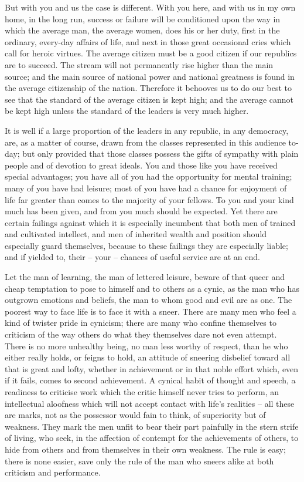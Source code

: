 \documentclass[a4paper]{amsbook}
\begin{document}
But with you and us the case is different. With you here, and with us in my own home, in the long run, success or failure will be conditioned upon the way in which the average man, the average women, does his or her duty, first in the ordinary, every-day affairs of life, and next in those great occasional cries which call for heroic virtues. The average citizen must be a good citizen if our republics are to succeed. The stream will not permanently rise higher than the main source; and the main source of national power and national greatness is found in the average citizenship of the nation. Therefore it behooves us to do our best to see that the standard of the average citizen is kept high; and the average cannot be kept high unless the standard of the leaders is very much higher.

It is well if a large proportion of the leaders in any republic, in any democracy, are, as a matter of course, drawn from the classes represented in this audience to-day; but only provided that those classes possess the gifts of sympathy with plain people and of devotion to great ideals. You and those like you have received special advantages; you have all of you had the opportunity for mental training; many of you have had leisure; most of you have had a chance for enjoyment of life far greater than comes to the majority of your fellows. To you and your kind much has been given, and from you much should be expected. Yet there are certain failings against which it is especially incumbent that both men of trained and cultivated intellect, and men of inherited wealth and position should especially guard themselves, because to these failings they are especially liable; and if yielded to, their – your – chances of useful service are at an end.

Let the man of learning, the man of lettered leisure, beware of that queer and cheap temptation to pose to himself and to others as a cynic, as the man who has outgrown emotions and beliefs, the man to whom good and evil are as one. The poorest way to face life is to face it with a sneer. There are many men who feel a kind of twister pride in cynicism; there are many who confine themselves to criticism of the way others do what they themselves dare not even attempt. There is no more unhealthy being, no man less worthy of respect, than he who either really holds, or feigns to hold, an attitude of sneering disbelief toward all that is great and lofty, whether in achievement or in that noble effort which, even if it fails, comes to second achievement. A cynical habit of thought and speech, a readiness to criticise work which the critic himself never tries to perform, an intellectual aloofness which will not accept contact with life's realities – all these are marks, not as the possessor would fain to think, of superiority but of weakness. They mark the men unfit to bear their part painfully in the stern strife of living, who seek, in the affection of contempt for the achievements of others, to hide from others and from themselves in their own weakness. The rule is easy; there is none easier, save only the rule of the man who sneers alike at both criticism and performance.
\end{document}
